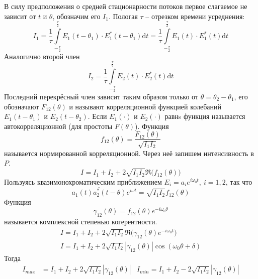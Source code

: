 	В силу предположения о средней стационарности потоков первое слагаемое не зависит от $t$ и $\theta$, обозначим его $I_{1}$. Пологая $\tau$ -- отрезком времени усреднения:
	\begin{equation*}
	I_{1} = \frac{1}{\tau} \int\limits_{-\frac{\tau}{2}}^{\frac{\tau}{2}} E_{1}(t - \theta_{1})\cdot E_{1}^{*}(t - \theta_{1}) \mathrm{d} t = \frac{1}{\tau} \int\limits_{-\frac{\tau}{2}}^{\frac{\tau}{2}} E_{1}(t)\cdot E_{1}^{*}(t) \mathrm{d} t
	\end{equation*}
	Аналогично второй член 
	\begin{equation*}
	I_{2} = \frac{1}{\tau} \int\limits_{-\frac{\tau}{2}}^{\frac{\tau}{2}} E_{2}(t)\cdot E_{2}^{*}(t) \mathrm{d} t
	\end{equation*}
	Последний перекрёсный член зависит таким образом только от $\theta = \theta_{2} - \theta_{1}$, его обозначают $F_{12}(\theta)$ и называют корреляционной функцией колебаний $E_{1}(t - \theta_{1}) $ и  $ E_{2}(t - \theta_{2})$. Если $E_{1}(\cdot)$ и  $E_{2}(\cdot)$ равнs функция называется автокорреляционной (для простоты $F(\theta)$).
	Функция
	$$f_{12}(\theta) = \frac{F_{12}(\theta)}{\sqrt{I_{1}I_{2}}}$$
	называется нормированной корреляционной. Через неё запишем интенсивность в $P$.
	$$I = I_{1} + I_{2} + 2\sqrt{I_{1}I_{2}}\Re\big(f_{12}(\theta)\big) $$
	Пользуясь квазимонохроматическим приближением $E_{i} = a_{i}e^{i\omega_{0}t}, \ i = 1,2$, так что
	\begin{equation*}
	\overline{a_{1}(t) a_{2}^{*}(t - \theta)}e^{i\omega t} = \sqrt{I_{1}I_{2}}f_{12}(\theta)
	\end{equation*}
	Функция 
	\begin{equation*}
	\gamma_{12}(\theta) = f_{12}(\theta)e^{-i\omega_{0} \theta}
	\end{equation*}
	называется комплексной степенью когерентности.
	\begin{gather*}
	I = I_{1} + I_{2} + 2\sqrt{I_{1}I_{2}}\Re\big(\gamma_{12}(\theta)e^{-i\omega_{0}t}\big) \\I = I_{1} + I_{2} + 2\sqrt{I_{1}I_{2}}|\gamma_{12}(\theta)|\cos(\omega_{0}\theta + \delta)
	\end{gather*}
	Тогда
	\begin{align}
	\label{maxmin}
	I_{max} &= I_{1} + I_{2} + 2\sqrt{I_{1}I_{2}}|\gamma_{12}(\theta)| & I_{min} = I_{1} + I_{2} - 2\sqrt{I_{1}I_{2}}|\gamma_{12}(\theta)|
	\end{align}
